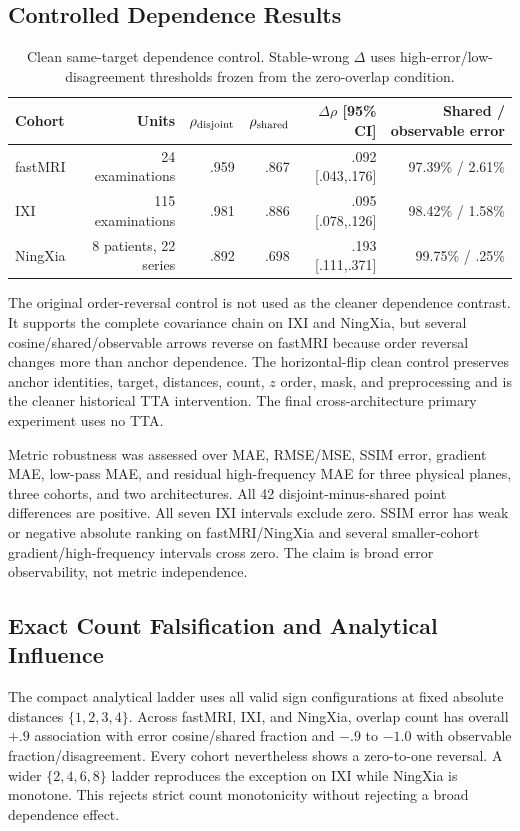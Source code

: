 \subsection{Controlled Dependence Results}
\begin{table}[t]
\centering
\caption{Clean same-target dependence control. Stable-wrong $\Delta$ uses high-error/low-disagreement thresholds frozen from the zero-overlap condition.}
\label{tab:clean-full}
\setlength{\tabcolsep}{4pt}
\begin{tabular}{lrrrrr}
\toprule
Cohort & Units & $\rho_{\rm disjoint}$ & $\rho_{\rm shared}$ & $\Delta\rho$ [95\% CI] & Shared / observable error \\
\midrule
fastMRI & 24 examinations & .959 & .867 & .092 [.043,.176] & 97.39\% / 2.61\% \\
IXI & 115 examinations & .981 & .886 & .095 [.078,.126] & 98.42\% / 1.58\% \\
NingXia & 8 patients, 22 series & .892 & .698 & .193 [.111,.371] & 99.75\% / .25\% \\
\bottomrule
\end{tabular}
\end{table}

The original order-reversal control is not used as the cleaner dependence contrast. It supports the complete covariance chain on IXI and NingXia, but several cosine/shared/observable arrows reverse on fastMRI because order reversal changes more than anchor dependence. The horizontal-flip clean control preserves anchor identities, target, distances, count, $z$ order, mask, and preprocessing and is the cleaner historical TTA intervention. The final cross-architecture primary experiment uses no TTA.

Metric robustness was assessed over MAE, RMSE/MSE, SSIM error, gradient MAE, low-pass MAE, and residual high-frequency MAE for three physical planes, three cohorts, and two architectures. All 42 disjoint-minus-shared point differences are positive. All seven IXI intervals exclude zero. SSIM error has weak or negative absolute ranking on fastMRI/NingXia and several smaller-cohort gradient/high-frequency intervals cross zero. The claim is broad error observability, not metric independence.

\subsection{Exact Count Falsification and Analytical Influence}
The compact analytical ladder uses all valid sign configurations at fixed absolute distances $\{1,2,3,4\}$. Across fastMRI, IXI, and NingXia, overlap count has overall $+.9$ association with error cosine/shared fraction and $-.9$ to $-1.0$ with observable fraction/disagreement. Every cohort nevertheless shows a zero-to-one reversal. A wider $\{2,4,6,8\}$ ladder reproduces the exception on IXI while NingXia is monotone. This rejects strict count monotonicity without rejecting a broad dependence effect.

